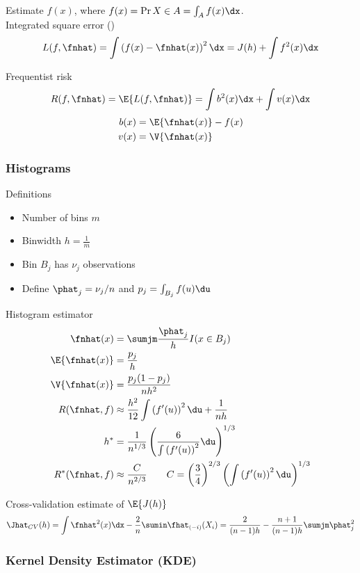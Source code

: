 \documentclass[landscape]{article}
\begin{document}
\begin{multicols*}{2}
Estimate $f(x)$, where $f(x) = \Pr{X \in A} = \int_A f(x)\dx$.\\

Integrated square error (\ise)
\[L(f, \fnhat) = \int\left(f(x) - \fnhat(x)\right)^2 \dx = J(h)+\int f^2(x)\dx\]

Frequentist risk
\[R(f, \fnhat) = \E{L(f,\fnhat)} = \int b^2(x) \dx + \int v(x) \dx\]
\begin{align*}
  b(x) &= \E{\fnhat(x)} - f(x) \\
  v(x) &= \V{\fnhat(x)}
\end{align*}

\subsubsection{Histograms}

Definitions
\begin{itemize}
  \item Number of bins $m$
  \item Binwidth $h = \frac{1}{m}$
  \item Bin $B_j$ has $\nu_j$ observations
  \item Define $\phat_j = \nu_j/n$ and $p_j = \int_{B_j} f(u)\du$
\end{itemize}

Histogram estimator
\begin{align*}
\fnhat(x) &= \sumjm \frac{\phat_j}{h} I(x\in B_j) \\
\E{\fnhat(x)} &= \frac{p_j}{h} \\
\V{\fnhat(x)} &= \frac{p_j(1-p_j)}{nh^2} \\
R(\fnhat,f) &\approx
\frac{h^2}{12} \int \left(f'(u)\right)^2 \du + \frac{1}{nh} \\
h^* &= \frac{1}{n^{1/3}} \left( \frac{6}{\int\left(f'(u) \right)^2}\du
\right)^{1/3} \\
R^*(\fnhat,f) &\approx \frac{C}{n^{2/3}} \qquad
C = \left(\frac{3}{4}\right)^{2/3} \left( \int\left( f'(u) \right)^2 \du
\right)^{1/3}
\end{align*}

Cross-validation estimate of $\E{J(h)}$
\[\Jhat_{CV}(h)
= \int \fnhat^2(x) \dx - \frac{2}{n}\sumin \fhat_{(-i)}(X_i)
= \frac{2}{(n-1)h} - \frac{n+1}{(n-1)h} \sumjm \phat_j^2\]

\subsubsection{Kernel Density Estimator (KDE)}


\end{multicols*}
\end{document}
